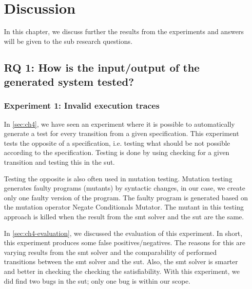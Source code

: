 \chapter{Discussion}\label{sec:ch6}

In this chapter, we discuss further the results from the experiments and answers
will be given to the sub research questions.

\section{RQ 1: How is the input/output of the generated system tested?}

\subsection{Experiment 1: Invalid execution traces}
In \autoref{sec:ch4}, we have seen an experiment where it is possible to
automatically generate a test for every transition from a given specification.
This experiment tests the opposite of a specification, i.e. testing what should
be not possible according to the specification. Testing is done by using
checking for a given transition and testing this in the \gls{sut}.

Testing the opposite is also often used in mutation testing. Mutation testing
generates faulty programs (mutants) by syntactic changes, in our case, we create
only one faulty version of the program. The faulty program is generated based on
the mutation operator Negate Conditionals Mutator. The mutant in this testing
approach is killed when the result from the \gls{smt} solver and the \gls{sut}
are the same.

In \autoref{sec:ch4-evaluation}, we discussed the evaluation of this experiment.
In short, this experiment produces some false positives/negatives. The reasons
for this are varying results from the \gls{smt} solver and the comparability of
performed transitions between the \gls{smt} solver and the \gls{sut}. Also, the
\gls{smt} solver is smarter and better in checking the checking the
satisfiability. With this experiment, we did find two bugs in the \gls{sut};
only one bug is within our scope.

